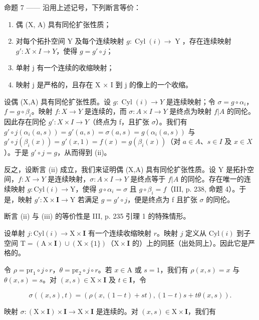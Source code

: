 命题 7 —— 沿用上述记号，下列断言等价：

\begin{enumerate}
\def\labelenumi{(\roman{enumi})}
\item
  偶 (X, A) 具有同伦扩张性质；
\item
  对每个拓扑空间 Y 及每个连续映射 \(g\colon \operatorname{Cyl}(i) \to \operatorname{Y}\)，存在连续映射 \(g'\colon X \times I \to Y\)，使得 \(g = g' \circ j\)；
\item
  单射 j 有一个连续的收缩映射；
\item
  映射 j 是严格的，且存在 X × I 到 j 的像上的一个收缩。
\end{enumerate}

设偶 (X,A) 具有同伦扩张性质。设 \(g:\operatorname{Cyl}(i)\to Y\) 是连续映射；令 \(\sigma=g\circ\alpha_i\)，\(f=g\circ\beta_i\)。映射 \(f:X\to Y\) 是连续的，而 \(\sigma:A\times I\to Y\) 是终点为映射 \(f|A\) 的同伦。因此存在同伦 \(g':X\times I\to Y\)（终点为 f，且扩张 \(\sigma\)）。我们有 \(g'\circ j(\alpha_i(a,s))=g'(a,s)=\sigma(a,s)=g(\alpha_i(a,s))\) 与 \(g'\circ j(\beta_i(x))=g'(x,1)=f(x)=g(\beta_i(x))\)（对 \(a\in A\)、\(s\in I\) 及 \(x\in X\)）。于是 \(g'\circ j=g\)，从而得到 (ii)。

反之，设断言 (ii) 成立，我们来证明偶 (X,A) 具有同伦扩张性质。设 Y 是拓扑空间，\(f:X\to Y\) 是连续映射，\(\sigma:A\times I\to Y\) 是终点等于 \(f|A\) 的同伦。存在唯一的连续映射 \(g:\mathrm{Cyl}(i)\to\mathrm{Y}\)，使得 \(g\circ\alpha_i=\sigma\) 且 \(g\circ\beta_i=f\)（III, p. 238, 命题 4）。于是，映射 \(g':\mathrm{X}\times\mathbf{I}\to\mathrm{Y}\) 若满足 \(g=g'\circ j\)，便是终点为 f 且扩张 \(\sigma\) 的同伦。

  断言 (ii) 与 (iii) 的等价性是 III, p. 235 引理 1 的特殊情形。

设单射 \(j\colon \mathrm{Cyl}(i)\to \mathrm{X}\times \mathbf{I}\) 有一个连续收缩映射 \(r\)。映射 \(j\) 定义从 \(\mathrm{Cyl}(i)\) 到子空间 \(\mathrm{T} = (\mathrm{A}\times \mathbf{I})\cup (\mathrm{X}\times \{1\})\)（\(\mathrm{X}\times \mathbf{I}\) 的）上的同胚（出处同上）。因此它是严格的。

令 \(\rho = \mathrm{pr}_1\circ j\circ r\)，\(\theta = \mathrm{pr}_2\circ j\circ r\)。若 \(x\in \mathrm{A}\) 或 \(s = 1\)，我们有 \(\rho (x,s) = x\) 与 \(\theta (x,s) = s\)。对 \((x,s)\in \mathrm{X}\times \mathbf{I}\) 及 \(t\in \mathbf{I}\)，令

\[
\sigma ((x, s), t) = (\rho (x, (1 - t) + s t), (1 - t) s + t \theta (x, s)).
\]

映射 \(\sigma\colon(\mathrm{X}\times\mathbf{I})\times\mathbf{I}\to\mathrm{X}\times\mathbf{I}\) 是连续的。对 \((x,s)\in\mathrm{X}\times\mathbf{I}\)，我们有

